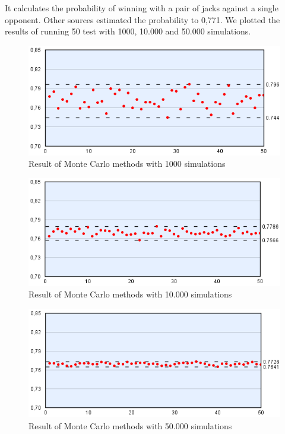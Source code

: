 It calculates the probability of winning with a pair of jacks against a single opponent. Other sources estimated the probability to 0,771.
We plotted the results of running 50 test with 1000, 10.000 and 50.000 simulations. 

\begin{figure}[h!]
  \center
    \includegraphics[scale=0.775]{images/MonteCarlo/1k.png}
  \caption{Result of Monte Carlo methods with 1000 simulations}
\end{figure}

\begin{figure}[h!]
  \center
    \includegraphics[scale=0.775]{images/MonteCarlo/10k.png}
  \caption{Result of Monte Carlo methods with 10.000 simulations}
\end{figure}

\begin{figure}[h!]
  \center
    \includegraphics[scale=0.775]{images/MonteCarlo/50k.png}
  \caption{Result of Monte Carlo methods with 50.000 simulations}
\end{figure}

